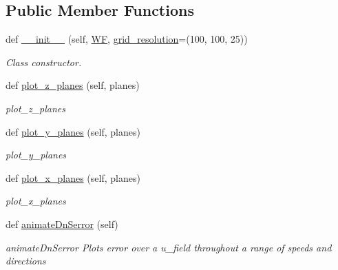 \subsection*{Public Member Functions}
\begin{DoxyCompactItemize}
\item 
def \mbox{\hyperlink{classvisualization__manager___d_j_1_1_visualization_manager_ac262d79ceedca2ca4dd92b078a0851f1}{\+\_\+\+\_\+init\+\_\+\+\_\+}} (self, \mbox{\hyperlink{classvisualization__manager___d_j_1_1_visualization_manager_a56add1b450c7ecd758b096117f593578}{WF}}, \mbox{\hyperlink{classvisualization__manager___d_j_1_1_visualization_manager_ad5b8013f5cdf47f6384ae56186810e2b}{grid\+\_\+resolution}}=(100, 100, 25))
\begin{DoxyCompactList}\small\item\em Class constructor. \end{DoxyCompactList}\item 
def \mbox{\hyperlink{classvisualization__manager___d_j_1_1_visualization_manager_a05c519f1e0389278308ee046d27724cd}{plot\+\_\+z\+\_\+planes}} (self, planes)
\begin{DoxyCompactList}\small\item\em plot\+\_\+z\+\_\+planes \end{DoxyCompactList}\item 
def \mbox{\hyperlink{classvisualization__manager___d_j_1_1_visualization_manager_ab0047d9eeda14999bdf8f8de191d9a33}{plot\+\_\+y\+\_\+planes}} (self, planes)
\begin{DoxyCompactList}\small\item\em plot\+\_\+y\+\_\+planes \end{DoxyCompactList}\item 
def \mbox{\hyperlink{classvisualization__manager___d_j_1_1_visualization_manager_a4705f5926bdcecfd8d2d5aff434b2120}{plot\+\_\+x\+\_\+planes}} (self, planes)
\begin{DoxyCompactList}\small\item\em plot\+\_\+x\+\_\+planes \end{DoxyCompactList}\item 
def \mbox{\hyperlink{classvisualization__manager___d_j_1_1_visualization_manager_ab660449be49e49325d864dd1176e83f0}{animate\+Dn\+Serror}} (self)
\begin{DoxyCompactList}\small\item\em animate\+Dn\+Serror Plots error over a u\+\_\+field throughout a range of speeds and directions \end{DoxyCompactList}\item 

\end{DoxyCompactItemize}
